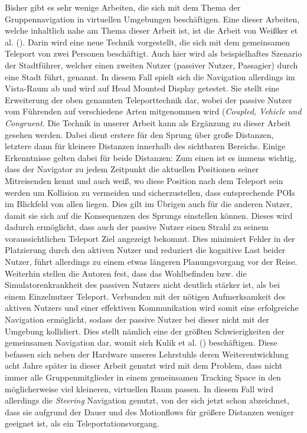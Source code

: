 Bisher gibt es sehr wenige Arbeiten, die sich mit dem Thema der Gruppennavigation in virtuellen Umgebungen beschäftigen. Eine dieser Arbeiten, welche inhaltlich nahe am Thema dieser Arbeit ist, ist die Arbeit von Weißker et al. (\cite{WeisskerMulti-RayReality}). Darin wird eine neue Technik vorgestellt, die sich mit dem gemeinsamen Teleport von zwei Personen beschäftigt. Auch hier wird als beispielhaftes Szenario der Stadtführer, welcher einen zweiten Nutzer (passiver Nutzer, Passagier) durch eine Stadt führt, genannt. 
In diesem Fall spielt sich die Navigation allerdings im Vista-Raum ab und wird auf Head Mounted Display getestet. Sie stellt eine Erweiterung der oben genannten Teleporttechnik dar, wobei der passive Nutzer vom Führenden auf verschiedene Arten mitgenommen wird (\textit{Coupled, Vehicle und Congruent}. Die Technik in unserer Arbeit kann als Ergänzung zu dieser Arbeit gesehen werden. Dabei dient erstere für den Sprung über große Distanzen, letztere dann für kleinere Distanzen innerhalb des sichtbaren Bereichs. Einige Erkenntnisse gelten dabei für beide Distanzen: Zum einen ist es immens wichtig, dass der Navigator zu jedem Zeitpunkt die aktuellen Positionen seiner Mitreisenden kennt und auch weiß, wo diese Position nach dem Teleport sein werden um Kollision zu vermeiden und sicherzustellen, dass entsprechende POIs im Blickfeld von allen liegen. Dies gilt im Übrigen auch für die anderen Nutzer, damit sie sich auf die Konsequenzen des Sprungs einstellen können. Dieses wird dadurch ermöglicht, dass auch der passive Nutzer einen Strahl zu seinem voraussichtlichen Teleport Ziel angezeigt bekommt. Dies minimiert Fehler in der Platzierung durch den aktiven Nutzer und reduziert die kognitive Last beider Nutzer, führt allerdings zu einem etwas längeren Planungsvorgang vor der Reise. Weiterhin stellen die Autoren fest, dass das Wohlbefinden bzw. die Simulatorenkrankheit des passiven Nutzers nicht deutlich stärker ist, als bei einem Einzelnutzer Teleport. Verbunden mit der nötigen Aufmerksamkeit des aktiven Nutzers und einer effektiven Kommunikation wird somit eine erfolgreiche Navigation ermöglicht, sodass der passive Nutzer bei dieser nicht mit der Umgebung kollidiert. Dies stellt nämlich eine der größten Schwierigkeiten der gemeinsamen Navigation dar, womit sich Kulik et al. (\cite{Kulik2011C1x6}) beschäftigen. Diese befassen sich neben der Hardware unseres Lehrstuhls deren Weiterentwicklung acht Jahre später in dieser Arbeit genutzt wird mit dem Problem, dass nicht immer alle Gruppenmitglieder in einem gemeinsamen Tracking Space in den möglicherweise viel kleineren, virtuellen Raum passen. In diesem Fall wird allerdings die \textit{Steering} Navigation genutzt, von der sich jetzt schon abzeichnet, dass sie aufgrund der Dauer und des Motionflows für größere Distanzen weniger geeignet ist, als ein Teleportationsvorgang.
